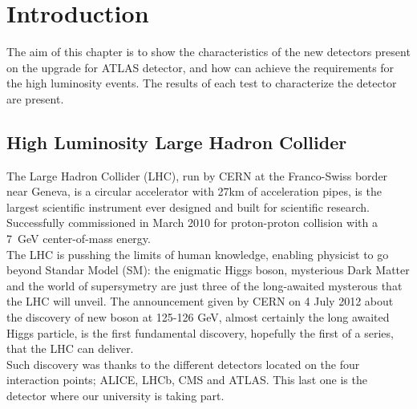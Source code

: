 \section{Introduction}
The aim of this chapter is to show the characteristics of the new detectors present on the upgrade for ATLAS detector,
and how can achieve the requirements for the high luminosity events.
The results of each test to characterize the detector are present.


\subsection{High Luminosity Large Hadron Collider}
The Large Hadron Collider (LHC), run by CERN at the Franco-Swiss border near Geneva, is a circular accelerator with 27km of acceleration pipes, is the largest scientific instrument ever designed and built for scientific research.
Successfully commissioned in March 2010 for proton-proton collision with a \SI{7}{GeV} center-of-mass energy.\\ The LHC is
pusshing the limits of human knowledge, enabling physicist to go beyond Standar Model (SM): the enigmatic Higgs boson,
mysterious Dark Matter and the world of supersymetry are just three of the long-awaited mysterous that the LHC will
unveil. The announcement given by CERN on 4 July 2012 about the discovery of new boson at 125-126 GeV, almost certainly
the long awaited Higgs particle, is the first fundamental discovery, hopefully the first of a series, that the LHC can
deliver.\\ Such discovery was thanks to the different detectors located on the four interaction points; ALICE, LHCb, CMS
and ATLAS. This last one is the detector where our university is taking part.\par
\par


